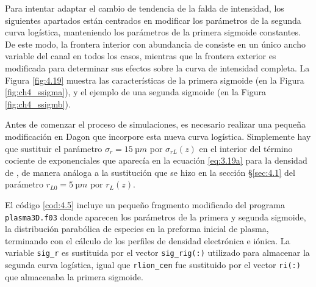Para intentar adaptar el cambio de tendencia de la falda de intensidad, los siguientes apartados están centrados en modificar los parámetros de la segunda curva logística, manteniendo los parámetros de la primera sigmoide constantes. De este modo, la frontera interior con abundancia de  consiste en un único ancho variable del canal en todos los casos, mientras que la frontera exterior es modificada para determinar sus efectos sobre la curva de intensidad completa. La Figura \ref{fig:4.19} muestra las características de la primera sigmoide (en la Figura \ref{fig:ch4_ssigma}), y el ejemplo de una segunda sigmoide (en la Figura \ref{fig:ch4_ssigmb}).

Antes de comenzar el proceso de simulaciones, es necesario realizar una pequeña modificación en Dagon que incorpore esta nueva curva logística. Simplemente hay que sustituir el parámetro $\sigma_{r}=\qty{15}{µm}$ por $\sigma_{rL}(z)$ en el interior del término cociente de exponenciales que aparecía en la ecuación \eqref{eq:3.19a} para la densidad de , de manera análoga a la sustitución que se hizo en la sección \S\ref{sec:4.1} del parámetro $r_{L0}=\qty{5}{µm}$ por $r_{L}(z)$. 

El código \ref{cod:4.5} incluye un pequeño fragmento modificado del programa \texttt{plasma3D.f03} donde aparecen los parámetros de la primera y segunda sigmoide, la distribución parabólica de especies en la preforma inicial de plasma, terminando con el cálculo de los perfiles de densidad electrónica e iónica. La variable \texttt{sig\_r} es sustituida por el vector \texttt{sig\_rig(:)} utilizado para almacenar la segunda curva logística, igual que \texttt{rlion\_cen} fue sustituido por el vector \texttt{ri(:)} que almacenaba la primera sigmoide.

